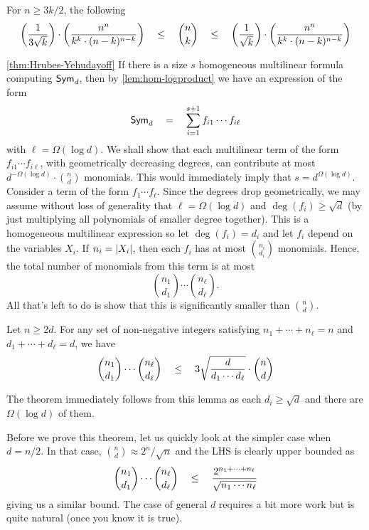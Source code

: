 \begin{lemma}\label{lem:stirling-binom} For $n \geq 3k/2$, the following 
\[
\left(\frac{1}{3\sqrt{k}}\right) \cdot \left(\frac{n^n}{k^k \cdot (n-k)^{n-k}}\right) \quad \leq \quad \binom{n}{k} \quad \leq \quad \left(\frac{1}{\sqrt{k}}\right) \cdot \left(\frac{n^n}{k^k \cdot (n-k)^{n-k}}\right)
\]
\end{lemma}

\begin{proofof}{\autoref{thm:Hrubes-Yehudayoff}}
If there is a size $s$ homogeneous multilinear formula computing $\operatorname{\mathsf{Sym}}_d$, then by \autoref{lem:hom-logproduct} we have an expression of the form
\[
\operatorname{\mathsf{Sym}}_d \quad = \quad \sum_{i=1}^{s+1} f_{i1} \cdots f_{i\ell}
\]
with $\ell = \Omega(\log d)$.
We shall show that each multilinear term of the form $f_{i1} \cdots f_{i\ell}$, with geometrically decreasing degrees, can contribute at most $d^{-\Omega(\log d)} \cdot \binom{n}{d}$ monomials.
This would immediately imply that $s = d^{\Omega(\log d)}$. \\


Consider a term of the form $f_1 \cdots f_\ell$. Since the degrees drop geometrically, we may assume without loss of generality that $\ell = \Omega(\log d)$ and $\deg(f_i) \geq \sqrt{d}$ (by just multiplying all polynomials of smaller degree together). This is a homogeneous multilinear expression so let $\deg(f_i) = d_i$ and let $f_i$ depend on the variables $X_i$. If $n_i = \left|X_i\right|$, then each $f_i$ has at most $\binom{n_i}{d_i}$ monomials. Hence, the total number of monomials from this term is at most
\[
\binom{n_1}{d_1} \cdots \binom{n_\ell}{d_\ell}.
\]
All that's left to do is show that this is significantly smaller than $\binom{n}{d}$. 

\begin{lemma}[\cite{HY11a}]\label{lem:HY-prod-binom}
Let $n\geq 2d$. For any set of non-negative integers satisfying $n_1 + \cdots + n_\ell = n$ and $d_1 + \cdots + d_\ell = d$, we have
\[
\binom{n_1}{d_1} \cdots \binom{n_\ell}{d_\ell} \quad \leq \quad 3 \sqrt{\frac{d}{d_1 \cdots d_\ell}} \cdot \binom{n}{d}
\]
\end{lemma}
The theorem immediately follows from this lemma as each $d_i \geq \sqrt{d}$ and there are $\Omega(\log d)$ of them. 

Before we prove this theorem, let us quickly look at the simpler case when $d = n/2$. In that case, $\binom{n}{d} \approx 2^n / \sqrt{n}$ and the LHS is clearly upper bounded as
\[
\binom{n_1}{d_1} \cdots \binom{n_\ell}{d_\ell} \quad \leq \quad \frac{2^{n_1+ \cdots + n_\ell}}{\sqrt{n_1 \cdots n_\ell}}
\]
giving us a similar bound. The case of general $d$ requires a bit more work but is quite natural (once you know it is true). 


\end{proofof}
